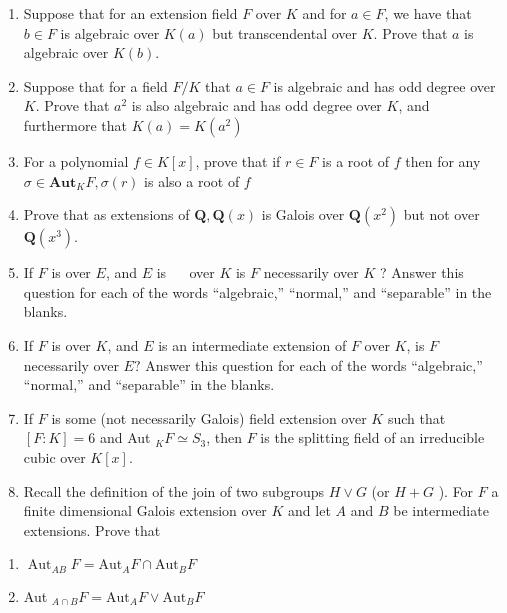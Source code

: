\begin{enumerate}
\def\labelenumi{\arabic{enumi}.}
\tightlist
\item
  Suppose that for an extension field \(F\) over \(K\) and for
  \(a \in F\), we have that \(b \in F\) is algebraic over \(K(a)\) but
  transcendental over \(K\). Prove that \(a\) is algebraic over
  \(K(b)\).
\item
  Suppose that for a field \(F / K\) that \(a \in F\) is algebraic and
  has odd degree over \(K\). Prove that \(a^{2}\) is also algebraic and
  has odd degree over \(K\), and furthermore that
  \(K(a)=K\left(a^{2}\right)\)
\item
  For a polynomial \(f \in K[x]\), prove that if \(r \in F\) is a root
  of \(f\) then for any \(\sigma \in \mathbf{A u t}_{K} F, \sigma(r)\)
  is also a root of \(f\)
\item
  Prove that as extensions of \(\boldsymbol{Q}, \boldsymbol{Q}(x)\) is
  Galois over \(\boldsymbol{Q}\left(x^{2}\right)\) but not over
  \(\boldsymbol{Q}\left(x^{3}\right)\).
\item
  If \(F\) is over \(E\), and \(E\) is \(\quad\) over \(K\) is \(F\)
  necessarily over \(K\) ? Answer this question for each of the words
  ``algebraic,'' ``normal,'' and ``separable'' in the blanks.
\item
  If \(F\) is over \(K\), and \(E\) is an intermediate extension of
  \(F\) over \(K\), is \(F\) necessarily over \(E ?\) Answer this
  question for each of the words ``algebraic,'' ``normal,'' and
  ``separable'' in the blanks.
\item
  If \(F\) is some (not necessarily Galois) field extension over \(K\)
  such that \([F: K]=6\) and Aut \(_{K} F \simeq S_{3}\), then \(F\) is
  the splitting field of an irreducible cubic over \(K[x]\).
\item
  Recall the definition of the join of two subgroups \(H \vee G\) (or
  \(H+G\) ). For \(F\) a finite dimensional Galois extension over \(K\)
  and let \(A\) and \(B\) be intermediate extensions. Prove that
\end{enumerate}

\begin{enumerate}
\def\labelenumi{\alph{enumi}.}
\tightlist
\item
  \(\operatorname{Aut}_{A B} F=\mathrm{Aut}_{A} F \cap \mathrm{Aut}_{B} F\)
\item
  Aut \(_{A \cap B} F=\mathrm{Aut}_{A} F \vee \mathrm{Aut}_{B} F\)
\end{enumerate}

